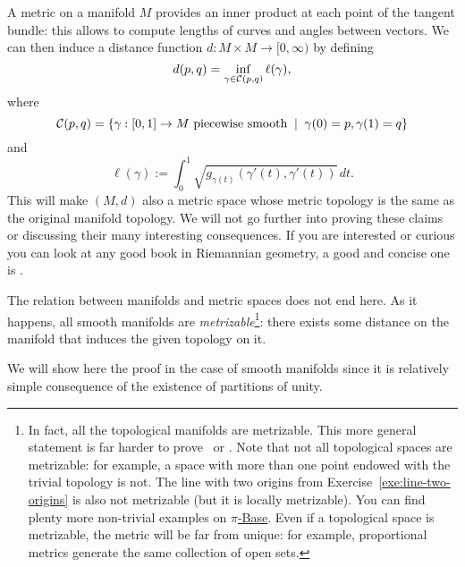 A metric on a manifold $M$ provides an inner product at each point of the tangent bundle: this allows to compute lengths of curves and angles between vectors. We can then induce a distance function $d: M \times M \to [0, \infty)$ by defining
\begin{equation}
  d(p,q) = \inf_{\gamma \in \mathcal{C}(p,q)} \ell(\gamma),
\end{equation}
where
\begin{equation}
  \mathcal{C}(p,q) = \left\{\gamma : [0,1] \to M \mbox{ piecewise smooth} \;\mid\; \gamma(0)=p, \gamma(1)=q\right\}
\end{equation}
and
\begin{equation}
  \ell(\gamma) := \int_0^1 \sqrt{g_{\gamma(t)}(\gamma'(t), \gamma'(t))}\, dt.
\end{equation}
This will make $(M, d)$ also a metric space whose metric topology is the same as the original manifold topology.
We will not go further into proving these claims or discussing their many interesting consequences.
If you are interested or curious you can look at any good book in Riemannian geometry,
a good and concise one is \cite[Chapter 6]{book:lee:riemannian}.

The relation between manifolds and metric spaces does not end here. As it happens, all smooth manifolds are \emph{metrizable}\footnote{In fact, all the topological manifolds are metrizable. This more general statement is far harder to prove~\cite[Theorem 34.1 and Exercise 1 of Chapter 4.36]{book:munkres:topology} or \cite{nlab:urysohn_metrization_theorem}. Note that not all topological spaces are metrizable: for example, a space with more than one point endowed with the trivial topology is not. The line with two origins from Exercise~\ref{exe:line-two-origins} is also not metrizable (but it is locally metrizable). You can find plenty more non-trivial examples on \href{https://topology.pi-base.org/spaces?q=\%7EMetrizable}{$\pi$-Base}. Even if a topological space is metrizable, the metric will be far from unique: for example, proportional metrics generate the same collection of open sets.}: there exists some distance on the manifold that induces the given topology on it.

We will show here the proof in the case of smooth manifolds since it is relatively simple consequence of the existence of partitions of unity.


